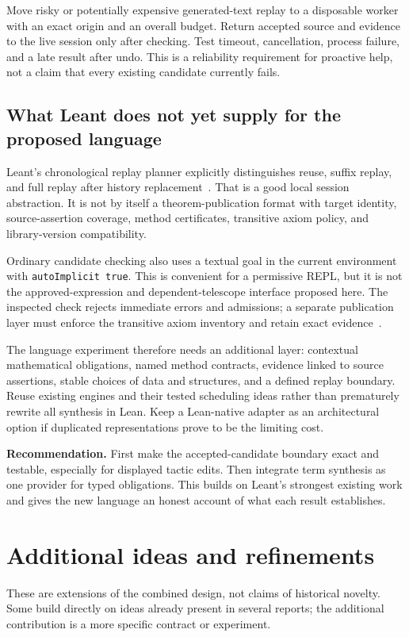 \documentclass[11pt,letterpaper]{article}
\newcommand{\code}[1]{\nolinkurl{#1}}
\newcommand{\decision}[1]{\par\smallskip\noindent\textbf{Recommendation.} #1\par\smallskip}
\begin{document}
Move risky or potentially expensive generated-text replay to a disposable worker
with an exact origin and an overall budget. Return accepted source and evidence to
the live session only after checking. Test timeout, cancellation, process failure,
and a late result after undo. This is a reliability requirement for proactive help,
not a claim that every existing candidate currently fails.

\subsection{What Leant does not yet supply for the proposed language}
Leant's chronological replay planner explicitly distinguishes reuse, suffix replay,
and full replay after history replacement~\cite{l-replay}. That is a good local
session abstraction. It is not by itself a theorem-publication format with target
identity, source-assertion coverage, method certificates, transitive axiom policy,
and library-version compatibility.

Ordinary candidate checking also uses a textual goal in the current environment
with \code{autoImplicit true}. This is convenient for a permissive REPL, but it
is not the approved-expression and dependent-telescope interface proposed here.
The inspected check rejects immediate errors and admissions; a separate publication
layer must enforce the transitive axiom inventory and retain exact evidence~\cite{l-fragment,l-main}.

The language experiment therefore needs an additional layer: contextual mathematical
obligations, named method contracts, evidence linked to source assertions, stable
choices of data and structures, and a defined replay boundary. Reuse existing
engines and their tested scheduling ideas rather than prematurely rewrite all
synthesis in Lean. Keep a Lean-native adapter as an architectural option if
duplicated representations prove to be the limiting cost.

\decision{First make the accepted-candidate boundary exact and testable, especially
for displayed tactic edits. Then integrate term synthesis as one provider for
typed obligations. This builds on Leant's strongest existing work and gives the
new language an honest account of what each result establishes.}

\section{Additional ideas and refinements}\label{sec:new}
These are extensions of the combined design, not claims of historical novelty.
Some build directly on ideas already present in several reports; the additional
contribution is a more specific contract or experiment.
\end{document}
